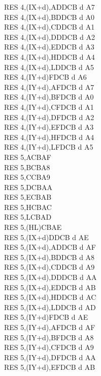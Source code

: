 \begin{multicols}{3}
{\begin{tabbing}
		RES 4,(IX+d),A\UNDOC\>DDCB d A7\\
		RES 4,(IX+d),B\UNDOC\>DDCB d A0\\
		RES 4,(IX+d),C\UNDOC\>DDCB d A1\\
		RES 4,(IX+d),D\UNDOC\>DDCB d A2\\
		RES 4,(IX+d),E\UNDOC\>DDCB d A3\\
		RES 4,(IX+d),H\UNDOC\>DDCB d A4\\
		RES 4,(IX+d),L\UNDOC\>DDCB d A5\\
		RES 4,(IY+d)\>FDCB d A6\\
		RES 4,(IY+d),A\UNDOC\>FDCB d A7\\
		RES 4,(IY+d),B\UNDOC\>FDCB d A0\\
		RES 4,(IY+d),C\UNDOC\>FDCB d A1\\
		RES 4,(IY+d),D\UNDOC\>FDCB d A2\\
		RES 4,(IY+d),E\UNDOC\>FDCB d A3\\
		RES 4,(IY+d),H\UNDOC\>FDCB d A4\\
		RES 4,(IY+d),L\UNDOC\>FDCB d A5\\
		RES 5,A\>CBAF\\
		RES 5,B\>CBA8\\
		RES 5,C\>CBA9\\
		RES 5,D\>CBAA\\
		RES 5,E\>CBAB\\
		RES 5,H\>CBAC\\
		RES 5,L\>CBAD\\
		RES 5,(HL)\>CBAE\\
		RES 5,(IX+d)\>DDCB d AE\\
		RES 5,(IX+d),A\UNDOC\>DDCB d AF\\
		RES 5,(IX+d),B\UNDOC\>DDCB d A8\\
		RES 5,(IX+d),C\UNDOC\>DDCB d A9\\
		RES 5,(IX+d),D\UNDOC\>DDCB d AA\\
		RES 5,(IX+d),E\UNDOC\>DDCB d AB\\
		RES 5,(IX+d),H\UNDOC\>DDCB d AC\\
		RES 5,(IX+d),L\UNDOC\>DDCB d AD\\
		RES 5,(IY+d)\>FDCB d AE\\
		RES 5,(IY+d),A\UNDOC\>FDCB d AF\\
		RES 5,(IY+d),B\UNDOC\>FDCB d A8\\
		RES 5,(IY+d),C\UNDOC\>FDCB d A9\\
		RES 5,(IY+d),D\UNDOC\>FDCB d AA\\
		RES 5,(IY+d),E\UNDOC\>FDCB d AB\\

\end{tabbing}}
\end{multicols}
